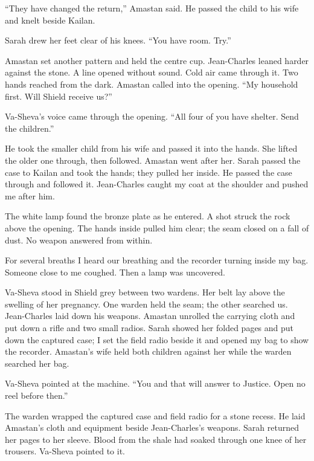 ``They have changed the return,'' Amastan said. He passed the child to his wife and knelt beside Kailan.\par

Sarah drew her feet clear of his knees. ``You have room. Try.''\par

Amastan set another pattern and held the centre cup. Jean-Charles leaned harder against the stone. A line opened without sound. Cold air came through it. Two hands reached from the dark. Amastan called into the opening. ``My household first. Will Shield receive us?''\par

Va-Sheva's voice came through the opening. ``All four of you have shelter. Send the children.''\par

He took the smaller child from his wife and passed it into the hands. She lifted the older one through, then followed. Amastan went after her. Sarah passed the case to Kailan and took the hands; they pulled her inside. He passed the case through and followed it. Jean-Charles caught my coat at the shoulder and pushed me after him.\par

The white lamp found the bronze plate as he entered. A shot struck the rock above the opening. The hands inside pulled him clear; the seam closed on a fall of dust. No weapon answered from within.\par

For several breaths I heard our breathing and the recorder turning inside my bag. Someone close to me coughed. Then a lamp was uncovered.\par

\ornament

Va-Sheva stood in Shield grey between two wardens. Her belt lay above the swelling of her pregnancy. One warden held the seam; the other searched us. Jean-Charles laid down his weapons. Amastan unrolled the carrying cloth and put down a rifle and two small radios. Sarah showed her folded pages and put down the captured case; I set the field radio beside it and opened my bag to show the recorder. Amastan's wife held both children against her while the warden searched her bag.\par

Va-Sheva pointed at the machine. ``You and that will answer to Justice. Open no reel before then.''\par

The warden wrapped the captured case and field radio for a stone recess. He laid Amastan's cloth and equipment beside Jean-Charles's weapons. Sarah returned her pages to her sleeve. Blood from the shale had soaked through one knee of her trousers. Va-Sheva pointed to it.\par

